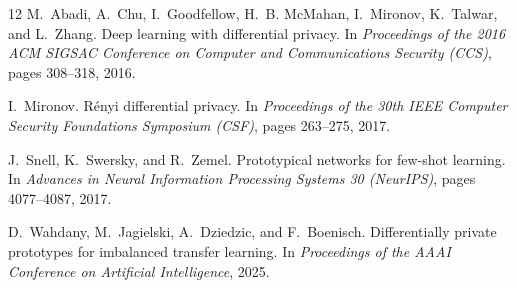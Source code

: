 \documentclass[11pt,a4paper]{report}
\theoremstyle{plain}
\theoremstyle{definition}
\theoremstyle{remark}
\begin{document}
\begin{thebibliography}{12}
M.~Abadi, A.~Chu, I.~Goodfellow, H.~B. McMahan, I.~Mironov, K.~Talwar, and L.~Zhang.
\newblock Deep learning with differential privacy.
\newblock In \emph{Proceedings of the 2016 ACM SIGSAC Conference on Computer and Communications Security (CCS)}, pages 308--318, 2016.

I.~Mironov.
\newblock R\'enyi differential privacy.
\newblock In \emph{Proceedings of the 30th IEEE Computer Security Foundations Symposium (CSF)}, pages 263--275, 2017.

J.~Snell, K.~Swersky, and R.~Zemel.
\newblock Prototypical networks for few-shot learning.
\newblock In \emph{Advances in Neural Information Processing Systems 30 (NeurIPS)}, pages 4077--4087, 2017.

D.~Wahdany, M.~Jagielski, A.~Dziedzic, and F.~Boenisch.
\newblock Differentially private prototypes for imbalanced transfer learning.
\newblock In \emph{Proceedings of the AAAI Conference on Artificial Intelligence}, 2025.

\end{thebibliography}
\end{document}
